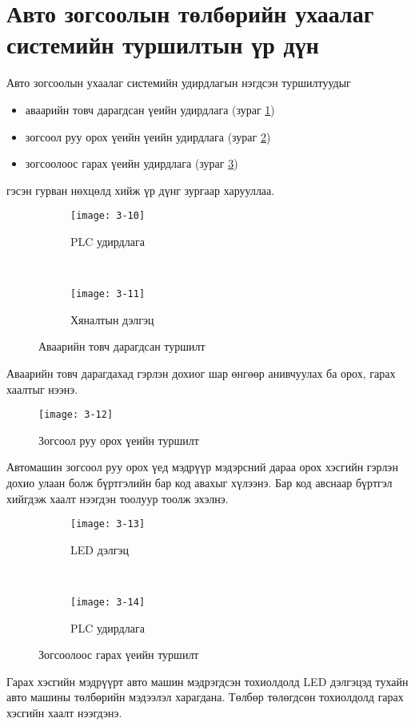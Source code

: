 \newpage
\section{Авто зогсоолын төлбөрийн ухаалаг системийн туршилтын үр дүн}
Авто зогсоолын ухаалаг системийн удирдлагын нэгдсэн туршилтуудыг 
\begin{itemize}
	\item аваарийн товч дарагдсан үеийн удирдлага (зураг \ref{fig:3-10})
	\item зогсоол руу орох үеийн үеийн удирдлага (зураг \ref{fig:3-11})
	\item зогсоолоос гарах үеийн удирдлага (зураг \ref{fig:3-12})
\end{itemize}
гэсэн гурван нөхцөлд хийж үр дүнг зургаар харууллаа. 
 \begin{figure}[!ht]
	\centering
\begin{subfigure}[b]{0.45\textwidth}
	\texttt{[image: 3-10]}
	\caption{PLC удирдлага}
\end{subfigure}
~
\begin{subfigure}[b]{0.45\textwidth}
	\texttt{[image: 3-11]}
	\caption{Хяналтын дэлгэц}
\end{subfigure}
	\caption{Аваарийн товч дарагдсан туршилт}
	\label{fig:3-10}
\end{figure}

Аваарийн товч дарагдахад гэрлэн дохиог шар өнгөөр анивчуулах ба орох, гарах хаалтыг нээнэ.\\
 \begin{figure}[!ht]
	\centering
	\texttt{[image: 3-12]}
	\caption{Зогсоол руу орох үеийн туршилт}
	\label{fig:3-11}
\end{figure}

Автомашин зогсоол руу орох үед мэдрүүр мэдэрсний дараа орох хэсгийн гэрлэн дохио улаан болж бүртгэлийн бар код авахыг хүлээнэ. Бар код авснаар бүртгэл хийгдэж хаалт нээгдэн тоолуур тоолж эхэлнэ. \\
 \begin{figure}[!ht]
	\centering
	\begin{subfigure}[b]{0.60\textwidth}
		\texttt{[image: 3-13]}
		\caption{LED дэлгэц}
	\end{subfigure}
	~
	\begin{subfigure}[b]{0.33\textwidth}
		\texttt{[image: 3-14]}
		\caption{PLC удирдлага}
	\end{subfigure}
	\caption{Зогсоолоос гарах үеийн туршилт}
	\label{fig:3-12}
\end{figure}

Гарах хэсгийн мэдрүүрт авто машин мэдрэгдсэн тохиолдолд LED дэлгэцэд тухайн авто машины төлбөрийн мэдээлэл харагдана. Төлбөр төлөгдсөн тохиолдолд гарах хэсгийн хаалт нээгдэнэ. 

